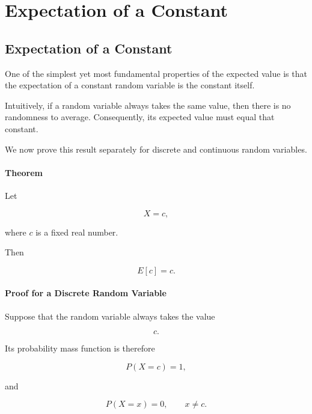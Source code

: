 \documentclass[11pt]{article}
\begin{document}
	\section{Expectation of a Constant}
	\begin{mdframed}[
		linewidth=0.8pt,
		roundcorner=6pt,
		backgroundcolor=gray!5,
		linecolor=gray!60,
		innertopmargin=10pt,
		innerbottommargin=10pt,
		innerleftmargin=10pt,
		innerrightmargin=10pt
		]
		
		\subsection*{Expectation of a Constant}
		
		One of the simplest yet most fundamental properties of the expected value is
		that the expectation of a constant random variable is the constant itself.
		
		Intuitively, if a random variable always takes the same value, then there is
		no randomness to average. Consequently, its expected value must equal that
		constant.
		
		We now prove this result separately for discrete and continuous random
		variables.
		
		\bigskip
		
		\paragraph{Theorem}
		
		Let
		
		\[
		X=c,
		\]
		
		where \(c\) is a fixed real number.
		
		Then
		
		\[
		\boxed{
			E[c]=c.
		}
		\]
		
		\bigskip
		
		\paragraph{Proof for a Discrete Random Variable}
		
		Suppose that the random variable always takes the value
		
		\[
		c.
		\]
		
		Its probability mass function is therefore
		
		\[
		P(X=c)=1,
		\]
		
		and
		
		\[
		P(X=x)=0,
		\qquad
		x\neq c.
		\]
		

\end{mdframed}
\end{document}
